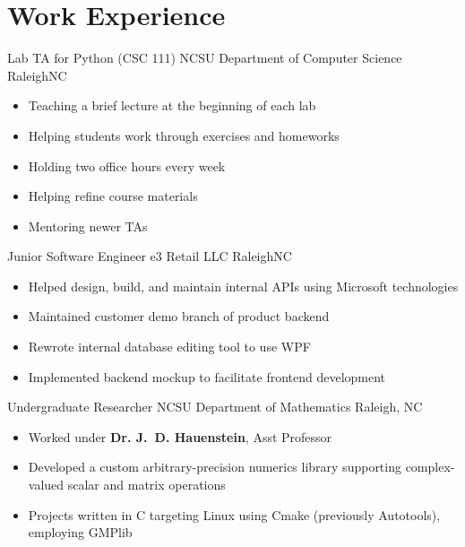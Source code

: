 \documentclass[11pt,letterpaper]{moderncv}
\begin{document}
\section{Work Experience}
    {Lab TA for Python (CSC 111)}
    {NCSU Department of Computer Science}
    {Raleigh}{NC}
    {
    	\begin{itemize}
			\item Teaching a brief lecture at the beginning of each lab
			\item Helping students work through exercises and homeworks
			\item Holding two office hours every week
			\item Helping refine course materials
			\item Mentoring newer TAs
		\end{itemize}
    }
    {Junior Software Engineer}
    {e3 Retail LLC}
    {Raleigh}{NC}
    {
        \begin{itemize}
            \item Helped design, build, and maintain internal APIs using Microsoft technologies
            \item Maintained customer demo branch of product backend
            \item Rewrote internal database editing tool to use WPF
            \item Implemented backend mockup to facilitate frontend development
        \end{itemize}
    }
    {Undergraduate Researcher}
    {NCSU Department of Mathematics}
    {Raleigh, NC}
    {}{
        \begin{itemize}
            \item Worked under \textbf{Dr. J.~D. Hauenstein}, Asst Professor
            \item Developed a custom arbitrary-precision numerics library supporting complex-valued scalar and matrix operations
            \item Projects written in C targeting Linux using Cmake (previously Autotools), employing GMPlib
        \end{itemize}
    }
\end{document}
